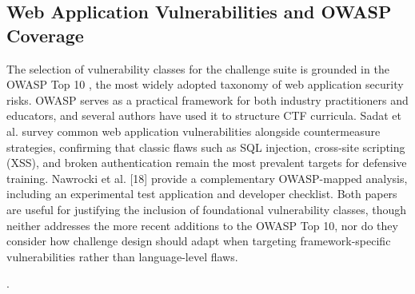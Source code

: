 \subsection{Web Application Vulnerabilities and OWASP Coverage}
The selection of vulnerability classes for the challenge suite is
grounded in the OWASP Top 10 \cite{OWASP2025}, the most widely adopted taxonomy of
web application security risks. OWASP serves as a practical framework
for both industry practitioners and educators, and several authors have
used it to structure CTF curricula. Sadat et al. \cite{sadat2024} survey common web
application vulnerabilities alongside countermeasure strategies,
confirming that classic flaws such as SQL injection, cross-site
scripting (XSS), and broken authentication remain the most prevalent
targets for defensive training. Nawrocki et al. [18] provide a
complementary OWASP-mapped analysis, including an experimental test
application and developer checklist. Both papers are useful for
justifying the inclusion of foundational vulnerability classes, though
neither addresses the more recent additions to the OWASP Top 10, nor do
they consider how challenge design should adapt when targeting
framework-specific vulnerabilities rather than language-level flaws.








\newpage
.
\newpage